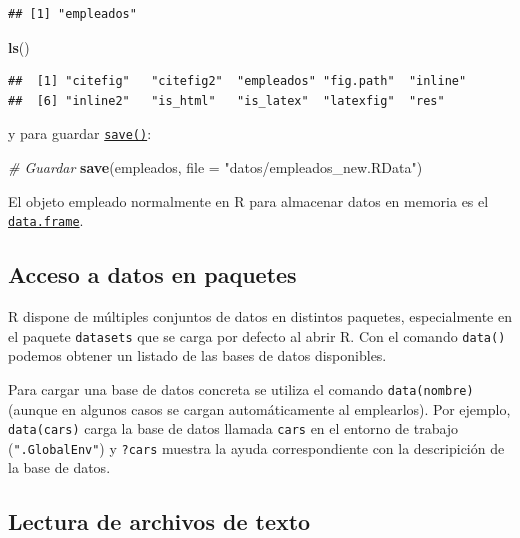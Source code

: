 \documentclass[]{book}
\newenvironment{Shaded}{\begin{snugshade}}{\end{snugshade}}
\newcommand{\KeywordTok}[1]{\textcolor[rgb]{0.13,0.29,0.53}{\textbf{#1}}}
\newcommand{\DataTypeTok}[1]{\textcolor[rgb]{0.13,0.29,0.53}{#1}}
\newcommand{\StringTok}[1]{\textcolor[rgb]{0.31,0.60,0.02}{#1}}
\newcommand{\CommentTok}[1]{\textcolor[rgb]{0.56,0.35,0.01}{\textit{#1}}}
\newcommand{\NormalTok}[1]{#1}
\begin{document}
\begin{verbatim}
## [1] "empleados"
\end{verbatim}

\begin{Shaded}
\begin{Highlighting}[]
\KeywordTok{ls}\NormalTok{()}
\end{Highlighting}
\end{Shaded}

\begin{verbatim}
##  [1] "citefig"   "citefig2"  "empleados" "fig.path"  "inline"   
##  [6] "inline2"   "is_html"   "is_latex"  "latexfig"  "res"
\end{verbatim}

y para guardar
\href{https://www.rdocumentation.org/packages/base/versions/3.6.1/topics/save}{\texttt{save()}}:

\begin{Shaded}
\begin{Highlighting}[]
\CommentTok{# Guardar}
\KeywordTok{save}\NormalTok{(empleados, }\DataTypeTok{file =} \StringTok{"datos/empleados_new.RData"}\NormalTok{)}
\end{Highlighting}
\end{Shaded}

El objeto empleado normalmente en R para almacenar datos en memoria es
el
\href{https://www.rdocumentation.org/packages/base/versions/3.6.1/topics/data.frame}{\texttt{data.frame}}.

\subsection{Acceso a datos en
paquetes}\label{acceso-a-datos-en-paquetes}

R dispone de múltiples conjuntos de datos en distintos paquetes,
especialmente en el paquete \texttt{datasets} que se carga por defecto
al abrir R. Con el comando \texttt{data()} podemos obtener un listado de
las bases de datos disponibles.

Para cargar una base de datos concreta se utiliza el comando
\texttt{data(nombre)} (aunque en algunos casos se cargan automáticamente
al emplearlos). Por ejemplo, \texttt{data(cars)} carga la base de datos
llamada \texttt{cars} en el entorno de trabajo (\texttt{".GlobalEnv"}) y
\texttt{?cars} muestra la ayuda correspondiente con la descripición de
la base de datos.

\subsection{Lectura de archivos de texto}\label{cap4-texto}
\end{document}
